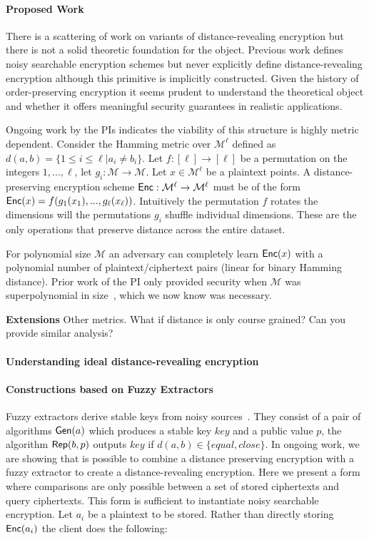 \paragraph{Proposed Work}
There is a scattering of work on variants of distance-revealing encryption but there is not a solid theoretic foundation for the object.  Previous work defines noisy searchable encryption schemes but never explicitly define distance-revealing encryption although this primitive is implicitly constructed.  Given the history of order-preserving encryption it seems prudent to understand the theoretical object and whether it offers meaningful security guarantees in realistic applications.

Ongoing work by the PIs indicates the viability of this structure is highly metric dependent.  Consider the Hamming metric over $\mathcal{M}^\ell$ defined as $d(a,b) = \{ 1\le i\le \ell | a_i \neq b_i\}$.  Let $f:[\ell] \rightarrow [\ell]$ be a permutation on the integers $1,..., \ell$, let $g_i: \mathcal{M}\rightarrow \mathcal{M}$.  Let $x\in\mathcal{M}^\ell$ be a plaintext points.  A distance-preserving encryption scheme $\mathsf{Enc}: \mathcal{M}^\ell\rightarrow \mathcal{M}^\ell$ must be of the form $\mathsf{Enc}(x) = f(g_1(x_1),..., g_\ell(x_\ell))$.  Intuitively the permutation $f$ rotates the dimensions will the permutations $g_i$ shuffle individual dimensions.  These are the only operations that preserve distance across the entire dataset.

 For polynomial size $\mathcal{M}$ an adversary can completely learn $\mathsf{Enc}(x)$ with a polynomial number of plaintext/ciphertext pairs (linear for binary Hamming distance).  Prior work of the PI only provided security when $\mathcal{M}$ was superpolynomial in size~\cite{EPRINT:ABCFG16}, which we now know was necessary.
 
 \textbf{Extensions} Other metrics.  What if distance is only course grained?  Can you provide similar analysis?

\paragraph{Understanding ideal distance-revealing encryption}
\paragraph{Constructions based on Fuzzy Extractors}
Fuzzy extractors derive stable keys from noisy sources~\cite{EC:DodReySmi04}.  They consist of a pair of algorithms $\mathsf{Gen}(a)$ which produces a stable key $key$ and a public value $p$, the algorithm $\mathsf{Rep}(b, p)$ outputs $key$ if $d(a,b)\in\{equal,close\}$.  In ongoing work, we are showing that is possible to combine a distance preserving encryption with a fuzzy extractor to create a distance-revealing encryption.  Here we present a form where comparisons are only possible between a set of stored ciphertexts and query ciphertexts.  This form is sufficient to instantiate noisy searchable encryption.  Let $a_i$ be a plaintext to be stored.  Rather than directly storing $\mathsf{Enc}(a_i)$ the client does the following:

